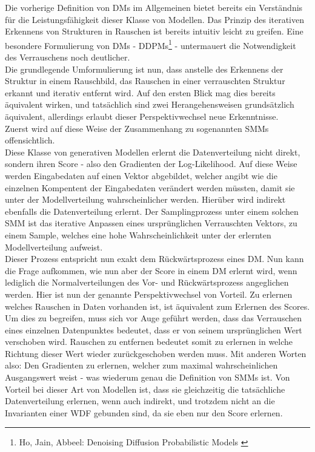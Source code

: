 Die vorherige Definition von \ac{DM}s im Allgemeinen bietet bereits ein Verständnis für die Leistungsfähigkeit dieser Klasse von Modellen. Das Prinzip des iterativen Erkennens von Strukturen in Rauschen ist bereits intuitiv leicht zu greifen. Eine besondere Formulierung von \ac{DM}s - \ac{DDPM}s\footnote{
    Ho, Jain, Abbeel: Denoising Diffusion Probabilistic Models
    \cite{ho2020denoisingdiffusionprobabilisticmodels}
} - untermauert die Notwendigkeit des Verrauschens noch deutlicher. \\
Die grundlegende Umformulierung ist nun, dass anstelle des Erkennens der Struktur in einem Rauschbild, das Rauschen in einer verrauschten Struktur erkannt und iterativ entfernt wird. Auf den ersten Blick mag dies bereits äquivalent wirken, und tatsächlich sind zwei Herangehensweisen grundsätzlich äquivalent, allerdings erlaubt dieser Perspektivwechsel neue Erkenntnisse. \\
Zuerst wird auf diese Weise der Zusammenhang zu sogenannten \ac{SMM}s  offensichtlich. \\
Diese Klasse von generativen Modellen erlernt die Datenverteilung nicht direkt, sondern ihren Score - also den Gradienten der Log-Likelihood. Auf diese Weise werden Eingabedaten auf einen Vektor abgebildet, welcher angibt wie die einzelnen Kompentent der Eingabedaten verändert werden müssten, damit sie unter der Modellverteilung wahrscheinlicher werden. Hierüber wird indirekt ebenfalls die Datenverteilung erlernt. Der Samplingprozess unter einem solchen \ac{SMM} ist das iterative Anpassen eines ursprünglichen Verrauschten Vektors, zu einem Sample, welches eine hohe Wahrscheinlichkeit unter der erlernten Modellverteilung aufweist. \\
Dieser Prozess entspricht nun exakt dem Rückwärtsprozess eines \ac{DM}. Nun kann die Frage aufkommen, wie nun aber der Score in einem \ac{DM} erlernt wird, wenn lediglich die Normalverteilungen des Vor- und Rückwärtsprozess angeglichen werden. Hier ist nun der genannte Perspektivwechsel von Vorteil. Zu erlernen welches Rauschen in Daten vorhanden ist, ist äquivalent zum Erlernen des Scores. Um dies zu begreifen, muss sich vor Auge geführt werden, dass das Verrauschen eines einzelnen Datenpunktes bedeutet, dass er von seinem ursprünglichen Wert verschoben wird. Rauschen zu entfernen bedeutet somit zu erlernen in welche Richtung dieser Wert wieder zurückgeschoben werden muss. Mit anderen Worten also: Den Gradienten zu erlernen, welcher zum maximal wahrscheinlichen Ausgangswert weist - was wiederum genau die Definition von \ac{SMM}s ist. Von Vorteil bei dieser Art von Modellen ist, dass sie gleichzeitig die tatsächliche Datenverteilung erlernen, wenn auch indirekt, und trotzdem nicht an die Invarianten einer \ac{WDF} gebunden sind, da sie eben nur den Score erlernen. \\
